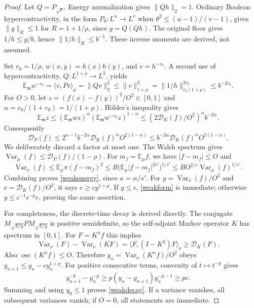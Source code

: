 \documentclass[11pt]{article}
\newcommand{\E}{\mathbb E}
\begin{document}
\begin{proof}
Let $Q=P_{\sqrt\rho}$. Energy normalization gives $\|Qh\|_2=1$.
Ordinary Boolean hypercontractivity, in the form
$P_\theta:L^u\to L^v$ when $\theta^2\leq(u-1)/(v-1)$,
gives $\|g\|_R\leq1$ for $R=1+1/\rho$, since $g=Q(Qh)$.
The original floor gives $1/h\leq g/b$, hence
$\|1/h\|_R\leq b^{-1}$. These inverse moments are derived, not assumed.

Set $r_0=1/\rho$, $w(x,y)=h(x)h(y)$, and $v=h^{-r_0}$.
A second use of hypercontractivity, $Q:L^{1+\rho}\to L^2$, yields
\[
 \E_{\mathfrak m}w^{-r_0}
 =\langle v,Pv\rangle_\mu=\|Qv\|_2^2
 \leq\|v\|_{1+\rho}^2
 =\|1/h\|_{r_0(1+\rho)}^{2r_0}
 \leq b^{-2r_0}.
\]
For $O>0$, let $z=(f(x)-f(y))^2/O^2\in[0,1]$ and
$\alpha=r_0/(1+r_0)=1/(1+\rho)$. H\"older's inequality gives
\[
 \E_{\mathfrak m}z
 \leq(\E_{\mathfrak m}wz)^\alpha
       (\E_{\mathfrak m}w^{-r_0}z)^{1-\alpha}
 \leq(2\mathcal D_K(f)/O^2)^\alpha b^{-2\alpha}.
\]
Consequently
\[
 \mathcal D_P(f)
 \leq 2^{\alpha-1}b^{-2\alpha}
         \mathcal D_K(f)^\alpha O^{2(1-\alpha)}
 \leq b^{-2\alpha}\mathcal D_K(f)^\alpha O^{2(1-\alpha)}.
\]
We deliberately discard a factor at most one. The Walsh spectrum gives
$\operatorname{Var}_\mu(f)\leq\mathcal D_P(f)/(1-\rho)$.
For $m_f=\E_\mu f$, we have $|f-m_f|\leq O$ and
\[
 \operatorname{Var}_\nu(f)
 \leq\E_\mu\pi(f-m_f)^2
 \leq B\bigl(\E_\mu|f-m_f|^{2s'}\bigr)^{1/s'}
 \leq B O^{2/s}\operatorname{Var}_\mu(f)^{1/s'}.
\]
Combining proves \eqref{weakenergy}, since $a=\alpha/s'$.
For $y=\operatorname{Var}_\nu(f)/O^2$ and
$e=\mathcal D_K(f)/O^2$, it says $e\geq c y^{1+p}$.
If $y\leq\epsilon$, \eqref{weakform} is immediate; otherwise
$y\leq c^{-1}\epsilon^{-p}e$, proving the same assertion.

For completeness, the discrete-time decay is derived directly.
The conjugate $M_{\sqrt{h/g}}P M_{\sqrt{h/g}}$ is positive semidefinite,
so the self-adjoint Markov operator $K$ has spectrum in $[0,1]$.
For $F=K^n f$ this implies
\[
 \operatorname{Var}_\nu(F)-\operatorname{Var}_\nu(KF)
 =\langle F,(I-K^2)F\rangle_\nu\geq\mathcal D_K(F).
\]
Also $\operatorname{osc}(K^n f)\leq O$. Therefore
$y_n=\operatorname{Var}_\nu(K^n f)/O^2$ obeys
$y_{n+1}\leq y_n-cy_n^{1+p}$.
For positive consecutive terms, convexity of $t\mapsto t^{-p}$ gives
\[
 y_{n+1}^{-p}-y_n^{-p}
 \geq p(y_n-y_{n+1})y_n^{-p-1}\geq pc.
\]
Summing and using $y_0\leq1$ proves \eqref{weakdecay}.
If a variance vanishes, all subsequent variances vanish; if $O=0$,
all statements are immediate.
\end{proof}
\end{document}

